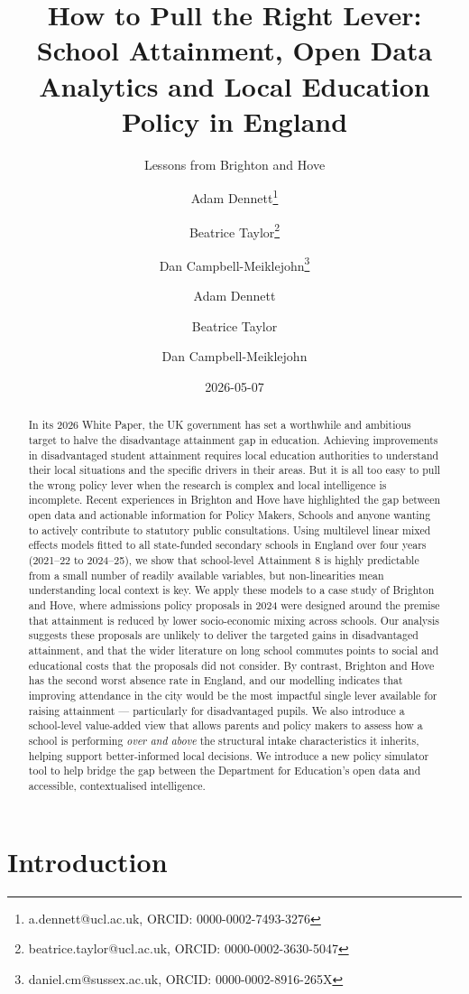 \documentclass[
  12pt,
  titlepage]{article}
\author[1]{Adam Dennett\thanks{a.dennett@ucl.ac.uk, ORCID: 0000-0002-7493-3276}}
\author[1]{Beatrice Taylor\thanks{beatrice.taylor@ucl.ac.uk, ORCID: 0000-0002-3630-5047 }}
\author[3]{Dan Campbell-Meiklejohn\thanks{daniel.cm@sussex.ac.uk, ORCID: 0000-0002-8916-265X}}
\affil[1]{Bartlett Centre for Advanced Spatial Analysis, University College London}
\affil[3]{School of Psychology, University of Sussex}
\title{How to Pull the Right Lever: School Attainment, Open Data
Analytics and Local Education Policy in England}
\subtitle{Lessons from Brighton and Hove}
\author{Adam Dennett \and Beatrice Taylor \and Dan Campbell-Meiklejohn}
\date{2026-05-07}
\begin{document}
\maketitle
\begin{abstract}
In its 2026 White Paper, the UK government has set a worthwhile and
ambitious target to halve the disadvantage attainment gap in education.
Achieving improvements in disadvantaged student attainment requires
local education authorities to understand their local situations and the
specific drivers in their areas. But it is all too easy to pull the
wrong policy lever when the research is complex and local intelligence
is incomplete. Recent experiences in Brighton and Hove have highlighted
the gap between open data and actionable information for Policy Makers,
Schools and anyone wanting to actively contribute to statutory public
consultations. Using multilevel linear mixed effects models fitted to
all state-funded secondary schools in England over four years (2021--22
to 2024--25), we show that school-level Attainment 8 is highly
predictable from a small number of readily available variables, but
non-linearities mean understanding local context is key. We apply these
models to a case study of Brighton and Hove, where admissions policy
proposals in 2024 were designed around the premise that attainment is
reduced by lower socio-economic mixing across schools. Our analysis
suggests these proposals are unlikely to deliver the targeted gains in
disadvantaged attainment, and that the wider literature on long school
commutes points to social and educational costs that the proposals did
not consider. By contrast, Brighton and Hove has the second worst
absence rate in England, and our modelling indicates that improving
attendance in the city would be the most impactful single lever
available for raising attainment --- particularly for disadvantaged
pupils. We also introduce a school-level value-added view that allows
parents and policy makers to assess how a school is performing
\emph{over and above} the structural intake characteristics it inherits,
helping support better-informed local decisions. We introduce a new
policy simulator tool to help bridge the gap between the Department for
Education's open data and accessible, contextualised intelligence.
\end{abstract}


\section{Introduction}\label{introduction}
\end{document}
